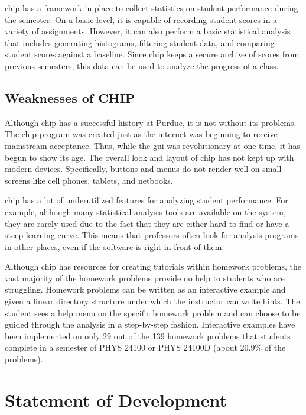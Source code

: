 \gls{chip} has a framework in place to collect statistics on student performance during the semester. On a basic level, it is capable of recording student scores in a variety of assignments. However, it can also perform a basic statistical analysis that includes generating histograms, filtering student data, and comparing student scores against a baseline. Since \gls{chip} keeps a secure archive of scores from previous semesters, this data can be used to analyze the progress of a class.

\subsection{Weaknesses of CHIP}

Although \gls{chip} has a successful history at Purdue, it is not without its problems. The \gls{chip} program was created just as the internet was beginning to receive mainstream acceptance. Thus, while the \gls{gui} was revolutionary at one time, it has begun to show its age. The overall look and layout of \gls{chip} has not kept up with modern devices. Specifically, buttons and menus do not render well on small screens like cell phones, tablets, and netbooks.

\gls{chip} has a lot of underutilized features for analyzing student performance. For example, although many statistical analysis tools are available on the system, they are rarely used due to the fact that they are either hard to find or have a steep learning curve. This means that professors often look for analysis programs in other places, even if the software is right in front of them.

Although \gls{chip} has resources for creating tutorials within homework problems, the vast majority of the homework problems provide no help to students who are struggling. Homework problems can be written as an interactive example and given a linear directory structure under which the instructor can write hints. The student sees a help menu on the specific homework problem and can choose to be guided through the analysis in a step-by-step fashion. Interactive examples have been implemented on only 29 out of the 139 homework problems that students complete in a semester of PHYS 24100 or PHYS 24100D (about 20.9\% of the problems).

\section{Statement of Development}

